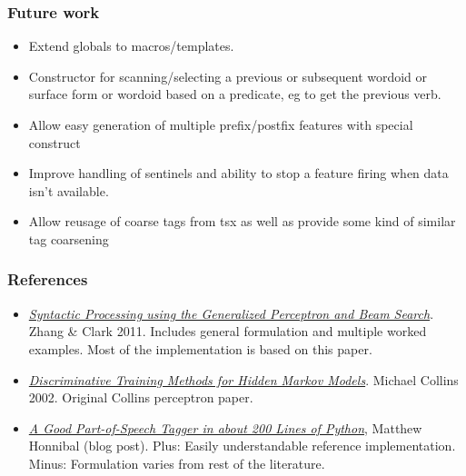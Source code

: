 \documentclass{beamer}
\begin{document}
\begin{frame}
\frametitle{Future work}
\begin{itemize}

  \item Extend globals to macros/templates.

  \item Constructor for scanning/selecting a previous or subsequent wordoid or
    surface form or wordoid based on a predicate, eg to get the previous verb.

  \item Allow easy generation of multiple prefix/postfix features with special
    construct

  \item Improve handling of sentinels and ability to stop a feature firing when
    data isn't available.

  \item Allow reusage of coarse tags from tsx as well as provide some kind of similar tag coarsening

\end{itemize}
\end{frame}

\begin{frame}
\frametitle{References}
\begin{itemize}

  \item[\raisebox{0.05cm}{\textcolor{yellow}{$\bigstar$}}]
    \textit{\href{http://www.mitpressjournals.org/doi/pdf/10.1162/coli_a_00037}{Syntactic
    Processing using the Generalized Perceptron and Beam Search}}. Zhang \&
    Clark 2011. Includes general formulation and multiple worked examples. Most
    of the implementation is based on this paper.

  \item
    \textit{\href{http://www.cs.columbia.edu/~mcollins/papers/tagperc.pdf}{Discriminative
    Training Methods for Hidden Markov Models}}. Michael Collins 2002.
    Original Collins perceptron paper.

  \item
    \textit{\href{https://spacy.io/blog/part-of-speech-pos-tagger-in-python}{A
    Good Part-of-Speech Tagger in about 200 Lines of Python}}, Matthew Honnibal
    (blog post).  Plus: Easily understandable reference implementation. Minus:
    Formulation varies from rest of the literature.

\end{itemize}
\end{frame}
\end{document}
